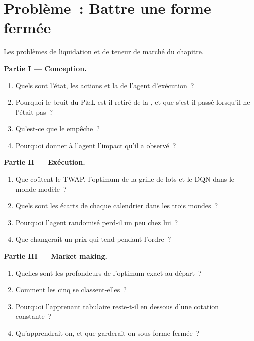 \section{Problème~: Battre une forme fermée}

\begin{problem}\label{pb:ml:reinforcement-learning-for-execution-and-market-making:1}
Les problèmes de liquidation et de teneur de marché du chapitre.

\medskip\noindent\textbf{Partie I --- Conception.}
\begin{enumerate}
\item Quels sont l'état, les actions et la  de l'agent d'exécution~?
\item Pourquoi le bruit du P\&L est-il retiré de la , et que s'est-il passé lorsqu'il ne l'était pas~?
\item Qu'est-ce que le  empêche~?
\item Pourquoi donner à l'agent l'impact qu'il a observé~?
\end{enumerate}

\medskip\noindent\textbf{Partie II --- Exécution.}
\begin{enumerate}[resume]
\item Que coûtent le TWAP, l'optimum de la grille de lots et le DQN dans le monde modèle~?
\item Quels sont les écarts de chaque calendrier dans les trois mondes~?
\item Pourquoi l'agent randomisé perd-il un peu chez lui~?
\item Que changerait un prix qui tend pendant l'ordre~?
\end{enumerate}

\medskip\noindent\textbf{Partie III --- Market making.}
\begin{enumerate}[resume]
\item Quelles sont les profondeurs de l'optimum exact au départ~?
\item Comment les cinq  se classent-elles~?
\item Pourquoi l'apprenant tabulaire reste-t-il en dessous d'une cotation constante~?
\item Qu'apprendrait-on, et que garderait-on sous forme fermée~?
\end{enumerate}


\end{problem}
